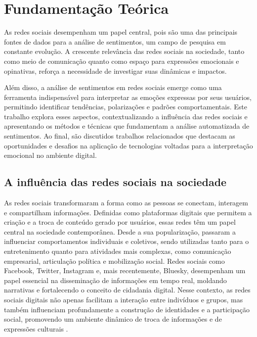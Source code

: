 \documentclass[
	12pt,				%
	oneside,			%
	a4paper,			%
	english,			%
	french,				%
	spanish,			%
	brazil				%
	]{abntex2}
\begin{document}
\hypertarget{fundamentauxe7uxe3o-teuxf3rica}{%
\chapter{Fundamentação Teórica}\label{fundamentauxe7uxe3o-teuxf3rica}}

As redes sociais desempenham um papel central, pois são uma das
principais fontes de dados para a análise de sentimentos, um campo de
pesquisa em constante evolução. A crescente relevância das redes sociais
na sociedade, tanto como meio de comunicação quanto como espaço para
expressões emocionais e opinativas, reforça a necessidade de investigar
suas dinâmicas e impactos.

Além disso, a análise de sentimentos em redes sociais emerge como uma
ferramenta indispensável para interpretar as emoções expressas por seus
usuários, permitindo identificar tendências, polarizações e padrões
comportamentais. Este trabalho explora esses aspectos, contextualizando
a influência das redes sociais e apresentando os métodos e técnicas que
fundamentam a análise automatizada de sentimentos. Ao final, são
discutidos trabalhos relacionados que destacam as oportunidades e
desafios na aplicação de tecnologias voltadas para a interpretação
emocional no ambiente digital.

\hypertarget{a-influuxeancia-das-redes-sociais-na-sociedade}{%
\section{A influência das redes sociais na
sociedade}\label{a-influuxeancia-das-redes-sociais-na-sociedade}}

As redes sociais transformaram a forma como as pessoas se conectam,
interagem e compartilham informações. Definidas como plataformas
digitais que permitem a criação e a troca de conteúdo gerado por
usuários, essas redes têm um papel central na sociedade contemporânea.
Desde a sua popularização, passaram a influenciar comportamentos
individuais e coletivos, sendo utilizadas tanto para o entretenimento
quanto para atividades mais complexas, como comunicação empresarial,
articulação política e mobilização social. Redes sociais como Facebook,
Twitter, Instagram e, mais recentemente, Bluesky, desempenham um papel
essencial na disseminação de informações em tempo real, moldando
narrativas e fortalecendo o conceito de cidadania digital. Nesse
contexto, as redes sociais digitais não apenas facilitam a interação
entre indivíduos e grupos, mas também influenciam profundamente a
construção de identidades e a participação social, promovendo um
ambiente dinâmico de troca de informações e de expressões culturais
\cite{pompei2021redes}.
\end{document}
